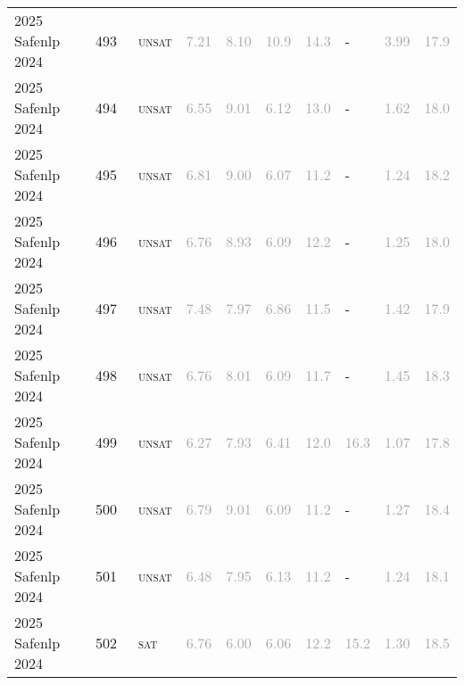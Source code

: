\begin{center}
{\begin{longtable}{@{}llllllllll@{}}
2025 Safenlp 2024 & 493 & ~\textsc{unsat} & \textcolor{darkgray}{7.21} & \textcolor{darkgray}{8.10} & \textcolor{darkgray}{10.9} & \textcolor{darkgray}{14.3} & - & \textcolor{darkgray}{3.99} & \textcolor{darkgray}{17.9} \\
2025 Safenlp 2024 & 494 & ~\textsc{unsat} & \textcolor{darkgray}{6.55} & \textcolor{darkgray}{9.01} & \textcolor{darkgray}{6.12} & \textcolor{darkgray}{13.0} & - & \textcolor{darkgray}{1.62} & \textcolor{darkgray}{18.0} \\
2025 Safenlp 2024 & 495 & ~\textsc{unsat} & \textcolor{darkgray}{6.81} & \textcolor{darkgray}{9.00} & \textcolor{darkgray}{6.07} & \textcolor{darkgray}{11.2} & - & \textcolor{darkgray}{1.24} & \textcolor{darkgray}{18.2} \\
2025 Safenlp 2024 & 496 & ~\textsc{unsat} & \textcolor{darkgray}{6.76} & \textcolor{darkgray}{8.93} & \textcolor{darkgray}{6.09} & \textcolor{darkgray}{12.2} & - & \textcolor{darkgray}{1.25} & \textcolor{darkgray}{18.0} \\
2025 Safenlp 2024 & 497 & ~\textsc{unsat} & \textcolor{darkgray}{7.48} & \textcolor{darkgray}{7.97} & \textcolor{darkgray}{6.86} & \textcolor{darkgray}{11.5} & - & \textcolor{darkgray}{1.42} & \textcolor{darkgray}{17.9} \\
2025 Safenlp 2024 & 498 & ~\textsc{unsat} & \textcolor{darkgray}{6.76} & \textcolor{darkgray}{8.01} & \textcolor{darkgray}{6.09} & \textcolor{darkgray}{11.7} & - & \textcolor{darkgray}{1.45} & \textcolor{darkgray}{18.3} \\
2025 Safenlp 2024 & 499 & ~\textsc{unsat} & \textcolor{darkgray}{6.27} & \textcolor{darkgray}{7.93} & \textcolor{darkgray}{6.41} & \textcolor{darkgray}{12.0} & \textcolor{darkgray}{16.3} & \textcolor{darkgray}{1.07} & \textcolor{darkgray}{17.8} \\
2025 Safenlp 2024 & 500 & ~\textsc{unsat} & \textcolor{darkgray}{6.79} & \textcolor{darkgray}{9.01} & \textcolor{darkgray}{6.09} & \textcolor{darkgray}{11.2} & - & \textcolor{darkgray}{1.27} & \textcolor{darkgray}{18.4} \\
2025 Safenlp 2024 & 501 & ~\textsc{unsat} & \textcolor{darkgray}{6.48} & \textcolor{darkgray}{7.95} & \textcolor{darkgray}{6.13} & \textcolor{darkgray}{11.2} & - & \textcolor{darkgray}{1.24} & \textcolor{darkgray}{18.1} \\
2025 Safenlp 2024 & 502 & ~\textsc{sat} & \textcolor{darkgray}{6.76} & \textcolor{darkgray}{6.00} & \textcolor{darkgray}{6.06} & \textcolor{darkgray}{12.2} & \textcolor{darkgray}{15.2} & \textcolor{darkgray}{1.30} & \textcolor{darkgray}{18.5} \\

\end{longtable}}
\end{center}
